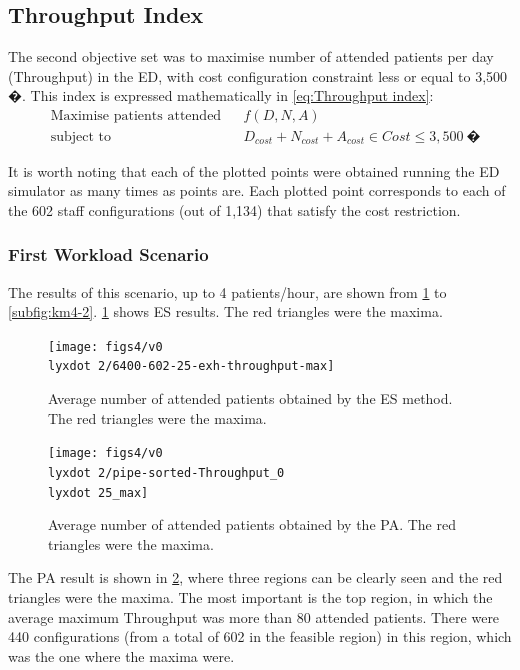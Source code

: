 \documentclass[11pt]{article} %
\begin{document}
\subsection{Throughput Index}

The second objective set was to maximise number of attended patients
per day (Throughput) in the ED, with cost configuration constraint
less or equal to 3,500 �. This index is expressed mathematically in
\ref{eq:Throughput index}:\vspace*{-0.125cm}
\begin{equation}
\begin{aligned} & {\text{Maximise patients attended}} &  & f(D,N,A)\\
 & \text{subject to} &  & D_{cost}+N_{cost}+A_{cost}\in Cost\leq3,500\:\text{�}
\end{aligned}
\label{eq:Throughput index}
\end{equation}


It is worth noting that each of the plotted points were obtained running
the ED simulator as many times as points are. Each plotted point corresponds
to each of the 602 staff configurations (out of 1,134) that satisfy
the cost restriction.


\subsubsection{First Workload Scenario}

The results of this scenario, up to 4 patients/hour, are shown from
\ref{subfig:es4-2} to \ref{subfig:km4-2}. \ref{subfig:es4-2} shows
ES results. The red triangles were the maxima.
\begin{figure}[H]
\centering{}\vspace*{-0.2cm}\texttt{[image: figs4/v0\\lyxdot 2/6400-602-25-exh-throughput-max]}\caption{Average number of attended patients obtained by the ES method. The
red triangles were the maxima. \label{subfig:es4-2}}
\end{figure}
 \vspace*{-0.2cm}

\begin{figure}[H]
\centering{}\vspace*{-0.2cm}\texttt{[image: figs4/v0\\lyxdot 2/pipe-sorted-Throughput\_0\\lyxdot 25\_max]}\caption{Average number of attended patients obtained by the PA. The red triangles
were the maxima. \label{subfig:pipe4-2}}
\end{figure}
 The PA result is shown in \ref{subfig:pipe4-2}, where three regions
can be clearly seen and the red triangles were the maxima. The most
important is the top region, in which the average maximum Throughput
was more than 80 attended patients. There were 440 configurations
(from a total of 602 in the feasible region) in this region, which
was the one where the maxima were.
\end{document}
